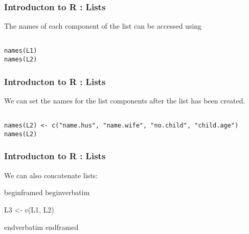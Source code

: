 \begin{frame}[fragile]
\frametitle{Introducton to R : Lists}
The names of each component of the list can be accessed using

\begin{framed}
\begin{verbatim}

names(L1)
names(L2)

\end{verbatim}
\end{framed}
\end{frame}
\begin{frame}[fragile]
\frametitle{Introducton to R : Lists}

We can set the names for the list components after the list has been
created.

\begin{framed}
\begin{verbatim}

names(L2) <- c("name.hus", "name.wife", "no.child", "child.age")
names(L2)

\end{verbatim}
\end{framed}
\end{frame}
\begin{frame}[fragile]
\frametitle{Introducton to R : Lists}

We can also concatenate lists:

begin{framed}
begin{verbatim}

L3 <- c(L1, L2)

end{verbatim}
end{framed}

\end{frame}
